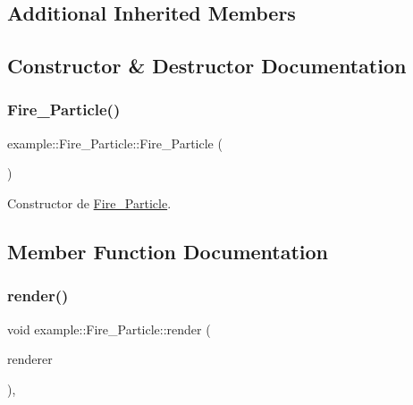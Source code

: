 \subsection*{Additional Inherited Members}


\subsection{Constructor \& Destructor Documentation}
\mbox{\label{classexample_1_1_fire___particle_a17b04781f4003239ead55e1999fcbe40}} 
\subsubsection{\texorpdfstring{Fire\_Particle()}{Fire\_Particle()}}
{\footnotesize\ttfamily example\+::\+Fire\+\_\+\+Particle\+::\+Fire\+\_\+\+Particle (\begin{DoxyParamCaption}{ }\end{DoxyParamCaption})}



Constructor de \mbox{\hyperlink{classexample_1_1_fire___particle}{Fire\+\_\+\+Particle}}. 



\subsection{Member Function Documentation}
\mbox{\label{classexample_1_1_fire___particle_a75c0920290826c96f3f94c3e5ef3c7c5}} 
\subsubsection{\texorpdfstring{render()}{render()}}
{\footnotesize\ttfamily void example\+::\+Fire\+\_\+\+Particle\+::render (\begin{DoxyParamCaption}\item[{sf\+::\+Render\+Window \&}]{renderer }\end{DoxyParamCaption})\hspace{0.3cm}{\ttfamily [override]}, {\ttfamily [virtual]}}



